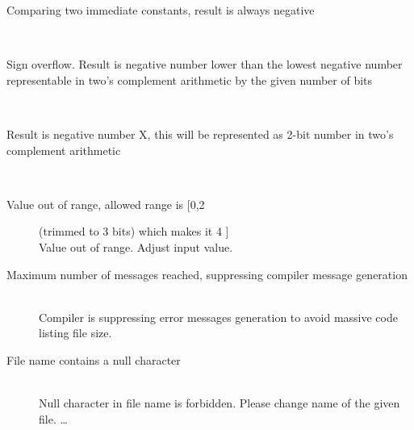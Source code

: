 {\begin{description}
                    \item[Comparing two immediate constants, result is always negative] \hfill \\

                    \item[Sign overflow. Result is negative number lower than the lowest negative number representable in two's complement arithmetic by the given number of bits ] \hfill \\

                    \item[Result is negative number X, this will be represented as 2-bit number in two's complement arithmetic] \hfill \\

                    \item[Value out of range, allowed range is [0,2] (trimmed to 3 bits) which makes it 4 ] \hfill \\
                    Value out of range. Adjust input value.                                                     %
                    \item[Maximum number of messages reached, suppressing compiler message generation ] \hfill \\
                    Compiler is suppressing error messages generation to avoid massive code listing file size.
                    \item[File name contains a null character ] \hfill \\
                    Null character in file name is forbidden. Please change name of the given file.
                    \ldots
                    \end{description}

}
